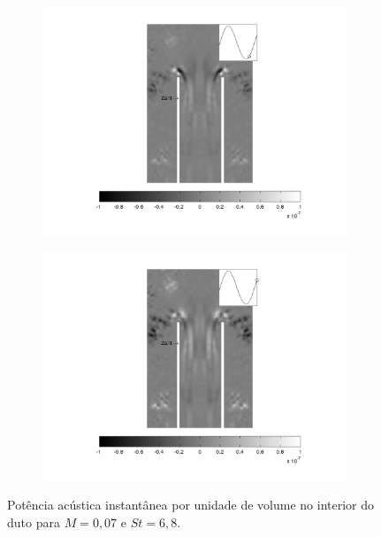 \begin{landscape}
\begin{figure}[ht!]
\begin{subfigure}{0.55 \textwidth}
  \includegraphics[width=1.\linewidth]{figuras/min_ka_007_5.png}
  \caption[]{}
  \label{fig:min_007_5}
\end{subfigure}
\begin{subfigure}{0.55 \textwidth}
  \includegraphics[width=1.\linewidth]{figuras/min_ka_007_6.png}
  \caption[]{}
  \label{fig:min_007_6}
\end{subfigure}
\caption[Potência acústica instantânea por unidade de volume para $M = 0,07$ e $St = 6,8$.]{Potência acústica instantânea por unidade de volume no interior do duto para $M = 0,07$ e $St = 6,8$.}\label{fig:min_007}
\end{figure}
\vfill
\clearpage
\end{landscape}

